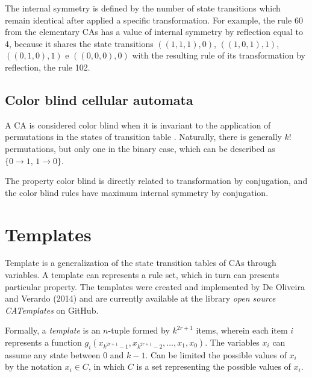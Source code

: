 \documentclass{llncs}
\begin{document}

The internal symmetry is defined by the number of state transitions which remain identical after applied a specific transformation. For example, the rule 60 from the elementary CAs has a value of internal symmetry by reflection equal to 4, because it shares the state transitions $((1,1,1),0)$, $((1,0,1),1)$, $((0,1,0),1)$ e $ ((0,0,0),0)$ with the resulting rule of its transformation by reflection, the rule 102.

\subsection{Color blind cellular automata}
A CA is considered color blind when it is invariant to the application of permutations in the states of transition table \cite{salo2013color}. Naturally, there is generally $k!$ permutations, but only one in the binary case, which can be described as $\{0 \to 1 ,\, 1 \to 0\}$. 

The property color blind is directly related to transformation by conjugation, and the color blind rules have maximum internal symmetry by conjugation.

\section{Templates}
\label{sec:templates}
Template is a generalization of the state transition tables of CAs through variables. A template can represents a rule set, which in turn can presents particular property. The templates were created and implemented by De Oliveira and Verardo (2014) and are currently available at the library \textit{open source CATemplates} \cite{CATemplates} on GitHub.

Formally, a \textit{template} is an $n$-tuple formed by $k^{2r+1}$ items, wherein each item $i$ represents a function $g_i(x_{k^{2r+1}-1},x_{k^{2r+1}-2},\dots,x_1,x_0)$. The variables $x_i$ can assume any state between 0 and $k-1$. Can be limited the possible values of $x_i$ by the notation $x_i \in C$, in which $C$ is a set representing the possible values of $x_i$. %
\end{document}
